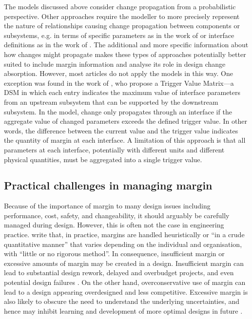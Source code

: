 The models discussed above consider change propagation from a probabilistic perspective. Other approaches require the modeller to more precisely represent the nature of relationships causing change propagation between components or subsystems, e.g. in terms of specific parameters as in the work of \cite{Ma2016} or interface definitions as in the work of \cite{Albers2011}. The additional and more specific information about how changes might propagate makes these types of approaches potentially better suited to include margin information and analyse its role in design change absorption. However, most articles do not apply the models in this way. One exception was found in the work of \cite{Oloufa2004}, who propose a Trigger Value Matrix---a DSM in which each entry indicates the maximum value of interface parameters from an upstream subsystem that can be supported by the downstream subsystem. In the model, change only propagates through an interface if the aggregate value of changed parameters exceeds the defined trigger value. In other words, the difference between the current value and the trigger value indicates the quantity of margin at each interface. A limitation of this approach is that all parameters at each interface, potentially with different units and different physical quantities, must be aggregated into a single trigger value.


\subsection{Practical challenges in managing margin}

Because of the importance of margin to many design issues including performance, cost, safety, and changeability, it should arguably be carefully managed during design. However, this is often not the case in engineering practice. \cite{Thunnissen2004b} write that, in practice, margins are handled heuristically or ``in a crude quantitative manner'' that varies depending on the individual and organisation, with ``little or no rigorous method''. In consequence, insufficient margin or excessive amounts of margin may be created in a design. Insufficient margin can lead to substantial design rework, delayed and overbudget projects, and even potential design failures \citep{Thunnisen2004}. On the other hand, overconservative use of margin can lead to a design appearing overdesigned and less competitive. Excessive margin is also likely to obscure the need to understand the underlying uncertainties, and hence may inhibit learning and development of more optimal designs in future \citep{Thunnissen2004b}.

